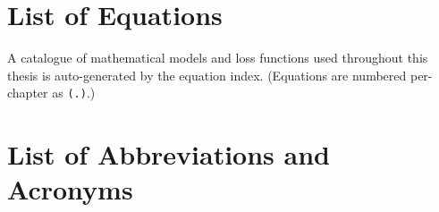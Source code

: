 \documentclass[12pt,a4paper,oneside]{book}
\theoremstyle{plain}
\theoremstyle{definition}
\theoremstyle{remark}
\begin{document}
\chapter*{List of Equations}

A catalogue of mathematical models and loss functions used throughout this
thesis is auto-generated by the equation index. (Equations are numbered
per-chapter as \texttt{(\thechapter.)}.)

\chapter*{List of Abbreviations and Acronyms}
\end{document}
